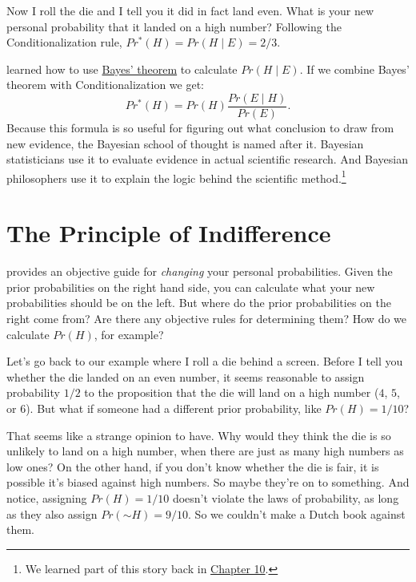 \documentclass[justified]{tufte-book}
\newcommand{\given}{\mid}
\renewcommand{\neg}{\mathbin{\sim}}
\newcommand{\pr}{Pr}
\newcommand{\po}{Pr^*}
\theoremstyle{definition}
\theoremstyle{definition}
\theoremstyle{definition}
\theoremstyle{remark}
\begin{document}
Now I roll the die and I tell you it did in fact land even. What is your new personal probability that it landed on a high number? Following the Conditionalization rule, \(\po(H) = \pr(H \given E) = 2/3\).

 learned how to use \protect\hyperlink{bayes-theorem}{Bayes' theorem} to calculate \(\pr(H \given E)\). If we combine Bayes' theorem with Conditionalization we get:
\[ \po(H) = \pr(H) \frac{\pr(E \given H)}{\pr(E)}. \]
Because this formula is so useful for figuring out what conclusion to draw from new evidence, the Bayesian school of thought is named after it. Bayesian statisticians use it to evaluate evidence in actual scientific research. And Bayesian philosophers use it to explain the logic behind the scientific method.\footnote{We learned part of this story back in \protect\hyperlink{probability-induction}{Chapter 10}.}

\hypertarget{the-principle-of-indifference}{%
\section{The Principle of Indifference}\label{the-principle-of-indifference}}

 provides an objective guide for \emph{changing} your personal probabilities. Given the prior probabilities on the right hand side, you can calculate what your new probabilities should be on the left. But where do the prior probabilities on the right come from? Are there any objective rules for determining them? How do we calculate \(\pr(H)\), for example?

Let's go back to our example where I roll a die behind a screen. Before I tell you whether the die landed on an even number, it seems reasonable to assign probability \(1/2\) to the proposition that the die will land on a high number (\(4\), \(5\), or \(6\)). But what if someone had a different prior probability, like \(\pr(H) = 1/10\)?

That seems like a strange opinion to have. Why would they think the die is so unlikely to land on a high number, when there are just as many high numbers as low ones? On the other hand, if you don't know whether the die is fair, it is possible it's biased against high numbers. So maybe they're on to something. And notice, assigning \(\pr(H) = 1/10\) doesn't violate the laws of probability, as long as they also assign \(\pr(\neg H) = 9/10\). So we couldn't make a Dutch book against them.
\end{document}
